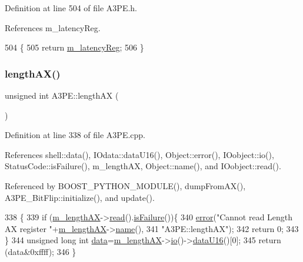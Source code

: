 Definition at line 504 of file A3\+P\+E.\+h.



References m\+\_\+latency\+Reg.


\begin{DoxyCode}
504                         \{
505     \textcolor{keywordflow}{return} \hyperlink{classA3PE_a96a167e73e264da5a18d9ddb5ebb5f23}{m\_latencyReg};
506   \}
\end{DoxyCode}
\mbox{\label{classA3PE_acb95104d817db2e4f97e250f7e45b43d}} 
\subsubsection{\texorpdfstring{length\+A\+X()}{lengthAX()}}
{\footnotesize\ttfamily unsigned int A3\+P\+E\+::length\+AX (\begin{DoxyParamCaption}{ }\end{DoxyParamCaption})}



Definition at line 338 of file A3\+P\+E.\+cpp.



References shell\+::data(), I\+Odata\+::data\+U16(), Object\+::error(), I\+Oobject\+::io(), Status\+Code\+::is\+Failure(), m\+\_\+length\+AX, Object\+::name(), and I\+Oobject\+::read().



Referenced by B\+O\+O\+S\+T\+\_\+\+P\+Y\+T\+H\+O\+N\+\_\+\+M\+O\+D\+U\+L\+E(), dump\+From\+A\+X(), A3\+P\+E\+\_\+\+Bit\+Flip\+::initialize(), and update().


\begin{DoxyCode}
338                            \{
339   \textcolor{keywordflow}{if} (\hyperlink{classA3PE_a87c93a38343873f2d52741deca4750ce}{m\_lengthAX}->\hyperlink{classIOobject_aa07610c11963b1db6710e3c76ceea456}{read}().\hyperlink{classStatusCode_a5dd22dc6eb2c52fc4cabc58f6dea2eb7}{isFailure}())\{
340     \hyperlink{classObject_a204a95f57818c0f811933917a30eff45}{error}(\textcolor{stringliteral}{"Cannot read Length AX register "}+\hyperlink{classA3PE_a87c93a38343873f2d52741deca4750ce}{m\_lengthAX}->\hyperlink{classObject_a300f4c05dd468c7bb8b3c968868443c1}{name}(),
341         \textcolor{stringliteral}{"A3PE::lengthAX"});
342     \textcolor{keywordflow}{return} 0;
343   \}
344   \textcolor{keywordtype}{unsigned} \textcolor{keywordtype}{long} \textcolor{keywordtype}{int} \hyperlink{namespaceshell_a5ea2525995cedc3efd69ea8a7f034d1e}{data}=\hyperlink{classA3PE_a87c93a38343873f2d52741deca4750ce}{m\_lengthAX}->\hyperlink{classIOobject_af04fb94137c3d86849f478ac5afab5d1}{io}()->\hyperlink{classIOdata_a8d8528b731c6cf117f8c5b9b2473390c}{dataU16}()[0];
345   \textcolor{keywordflow}{return} (data&0xffff);
346 \}
\end{DoxyCode}
\mbox{\label{classA3PE_a65235f7d42e8f7fb6056f5629545d2aa}} 
